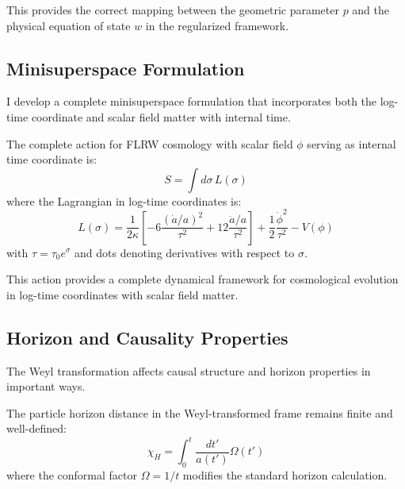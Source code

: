 This provides the correct mapping between the geometric parameter $p$ and the physical equation of state $w$ in the regularized framework.

\subsection{Minisuperspace Formulation}
\label{subsec:minisuperspace}

I develop a complete minisuperspace formulation that incorporates both the log-time coordinate and scalar field matter with internal time.

\begin{theorem}
\label{thm:minisuperspace_action}
The complete action for FLRW cosmology with scalar field $\phi$ serving as internal time coordinate is:
\begin{equation}
S = \int d\sigma \, L(\sigma)
\end{equation}
where the Lagrangian in log-time coordinates is:
\begin{equation}
L(\sigma) = \frac{1}{2\kappa} \left[ -6 \frac{(\dot{a}/a)^2}{\tau^2} + 12 \frac{\ddot{a}/a}{\tau^2} \right] + \frac{1}{2} \frac{\dot{\phi}^2}{\tau^2} - V(\phi)
\end{equation}
with $\tau = \tau_0 e^\sigma$ and dots denoting derivatives with respect to $\sigma$.
\end{theorem}

This action provides a complete dynamical framework for cosmological evolution in log-time coordinates with scalar field matter.

\subsection{Horizon and Causality Properties}
\label{subsec:horizon_causality}

The Weyl transformation affects causal structure and horizon properties in important ways.

\begin{theorem}
\label{thm:particle_horizon_weyl}
The particle horizon distance in the Weyl-transformed frame remains finite and well-defined:
\begin{equation}
\chi_H = \int_0^t \frac{dt'}{a(t')} \Omega(t')
\end{equation}
where the conformal factor $\Omega = 1/t$ modifies the standard horizon calculation.
\end{theorem}

